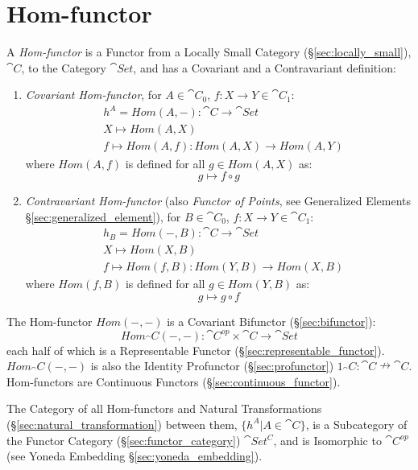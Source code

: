 \section{Hom-functor}\label{sec:hom_functor}

A \emph{Hom-functor} is a Functor from a Locally Small Category
(\S\ref{sec:locally_small}), $\cat{C}$, to the Category $\cat{Set}$,
and has a Covariant and a Contravariant definition:

\begin{enumerate}
  \item \emph{Covariant Hom-functor}, for $A \in \cat{C}_0$, $f : X
    \rightarrow Y \in \cat{C}_1$:
\[
\begin{split}
  & h^A = Hom(A,-) : \cat{C} \rightarrow \cat{Set} \\
  & X \mapsto Hom(A,X) \\
  & f \mapsto Hom(A,f) : Hom(A,X) \rightarrow Hom(A,Y)
\end{split}
\]
  where $Hom(A,f)$ is defined for all $g \in Hom(A,X)$ as:
\[
  g \mapsto f \circ g
\]

  \item \emph{Contravariant Hom-functor} (also \emph{Functor of
    Points}, see Generalized Elements
    \S\ref{sec:generalized_element}), for $B \in \cat{C}_0$, $f : X
    \rightarrow Y \in \cat{C}_1$:
\[
\begin{split}
  & h_B = Hom(-,B) : \cat{C} \rightarrow \cat{Set} \\
  & X \mapsto Hom(X,B) \\
  & f \mapsto Hom(f,B) : Hom(Y,B) \rightarrow Hom(X,B)
\end{split}
\]
  where $Hom(f,B)$ is defined for all $g \in Hom(Y,B)$ as:
\[
  g \mapsto g \circ f
\]
\end{enumerate}

The Hom-functor $Hom(-,-)$ is a Covariant Bifunctor
(\S\ref{sec:bifunctor}):
\[
  Hom_\cat{C}(-,-):
    \cat{C}^{op} \times \cat{C} \rightarrow \cat{Set}
\]
each half of which is a Representable Functor
(\S\ref{sec:representable_functor}). $Hom_\cat{C}(-,-)$ is also the
Identity Profunctor (\S\ref{sec:profunctor}) $1_\cat{C} :
\cat{C} \nrightarrow \cat{C}$. Hom-functors are Continuous
Functors (\S\ref{sec:continuous_functor}).

The Category of all Hom-functors and Natural Transformations
(\S\ref{sec:natural_transformation}) between them, $\{ h^A | A \in
\cat{C} \}$, is a Subcategory of the Functor Category
(\S\ref{sec:functor_category}) $\cat{Set^C}$, and is Isomorphic to
$\cat{C^{op}}$ (see Yoneda Embedding \S\ref{sec:yoneda_embedding}).

